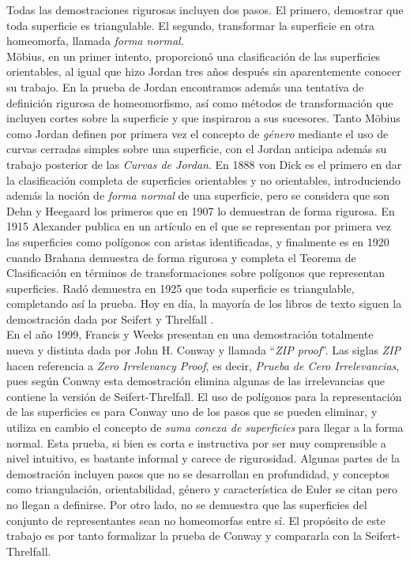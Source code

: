 \documentclass[10pt]{report}
\theoremstyle{definition}
\begin{document}
Todas las demostraciones rigurosas incluyen dos pasos. El primero, demostrar que toda superficie es triangulable. El segundo, transformar la superficie en otra homeomorfa, llamada \textit{forma normal}. \\
Möbius, en un primer intento, proporcionó una clasificación de las superficies orientables, al igual que hizo Jordan \cite{jordan} tres años después sin aparentemente conocer su trabajo. En la prueba de Jordan encontramos además una tentativa de definición rigurosa de homeomorfismo, así como métodos de transformación que incluyen cortes sobre la superficie y que inspiraron a sus sucesores. Tanto Möbius como Jordan definen por primera vez el concepto de \textit{género} mediante el uso de curvas cerradas simples sobre una superficie, con el Jordan anticipa además su trabajo posterior de las \textit{Curvas de Jordan}.
En 1888 von Dick \cite{vondick} es el primero en dar la clasificación completa de superficies orientables y no orientables, introduciendo además la noción de \textit{forma normal} de una superficie, pero se considera que son Dehn y Heegaard los primeros que en 1907 \cite{dehn} lo demuestran de forma rigurosa. En 1915 Alexander publica en un artículo \cite{alexander} en el que se representan por primera vez las superficies como polígonos con aristas identificadas, y finalmente es en 1920 cuando Brahana \cite{brahana} demuestra de forma rigurosa y completa el Teorema de Clasificación en términos de transformaciones sobre polígonos que representan superficies. Radó \cite{rado} demuestra en 1925 que toda superficie es triangulable, completando así la prueba.
Hoy en día, la mayoría de los libros de texto siguen la demostración dada por Seifert y Threlfall \cite{seifert}.\\

En el año 1999, Francis y Weeks presentan en \cite{zip} una demostración totalmente nueva y distinta dada por John H. Conway y llamada ``\textit{ZIP proof}''. Las siglas \textit{ZIP} hacen referencia a \textit{Zero Irrelevancy Proof}, es decir, \textit{Prueba de Cero Irrelevancias}, pues según Conway esta demostración elimina algunas de las irrelevancias que contiene la versión de Seifert-Threlfall. El uso de polígonos para la representación de las superficies es para Conway uno de los pasos que se pueden eliminar, y utiliza en cambio el concepto de \textit{suma conexa de superficies} para llegar a la forma normal. Esta prueba, si bien es corta e instructiva por ser muy comprensible a nivel intuitivo, es bastante informal y carece de rigurosidad. Algunas partes de la demostración incluyen pasos que no se desarrollan en profundidad, y conceptos como triangulación, orientabilidad, género y característica de Euler se citan pero no llegan a definirse. Por otro lado, no se demuestra que las superficies del conjunto de representantes sean no homeomorfas entre sí. El propósito de este trabajo es por tanto formalizar la prueba de Conway y compararla con la Seifert-Threlfall.\\
\end{document}

